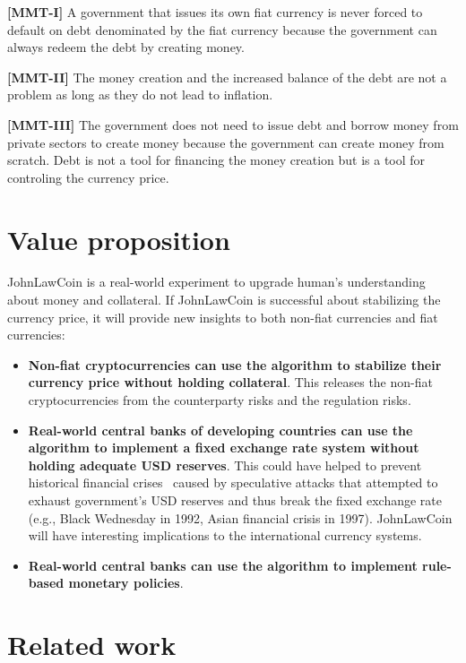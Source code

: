 \documentclass[dvipdfmx,a4paper]{article}
\begin{document}
\begin{description}
\item{\textbf{[MMT-I]}} A government that issues its own fiat currency is never forced to default on debt denominated by the fiat currency because the government can always redeem the debt by creating money.
\item{\textbf{[MMT-II]}} The money creation and the increased balance of the debt are not a problem as long as they do not lead to inflation.
\item{\textbf{[MMT-III]}} The government does not need to issue debt and borrow money from private sectors to create money because the government can create money from scratch. Debt is not a tool for financing the money creation but is a tool for controling the currency price.
\end{description}

\section{Value proposition}

JohnLawCoin is a real-world experiment to upgrade human's understanding about money and collateral. If JohnLawCoin is successful about stabilizing the currency price, it will provide new insights to both non-fiat currencies and fiat currencies:

\begin{itemize}
\item \textbf{Non-fiat cryptocurrencies can use the algorithm to stabilize their currency price without holding collateral}. This releases the non-fiat cryptocurrencies from the counterparty risks and the regulation risks.
\item \textbf{Real-world central banks of developing countries can use the algorithm to implement a fixed exchange rate system without holding adequate USD reserves}. This could have helped to prevent historical financial crises~\cite{ferguson2008ascent} caused by speculative attacks that attempted to exhaust government's USD reserves and thus break the fixed exchange rate (e.g., Black Wednesday in 1992, Asian financial crisis in 1997). JohnLawCoin will have interesting implications to the international currency systems.
\item \textbf{Real-world central banks can use the algorithm to implement rule-based monetary policies}.
\end{itemize}

\section{Related work}
\end{document}
